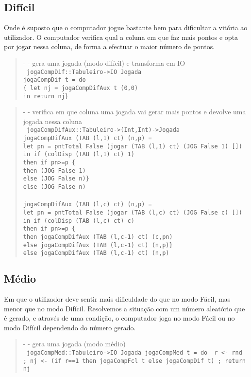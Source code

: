 \documentclass[a4paper,titlepage]{scrreprt}
\begin{document}
		\subsection{Difícil}
		Onde é suposto que o computador jogue bastante bem para dificultar a vitória ao utilizador. O computador
		verifica qual a coluna em que faz mais pontos e opta por jogar nessa coluna, de forma a efectuar o maior número de pontos.
			\begin{quote}
				{\small - - gera uma jogada (modo difícil) e transforma em IO\\}
				{\tt
				jogaCompDif::Tabuleiro->IO Jogada\\
				jogaCompDif t = do\\
				\{ let nj = jogaCompDifAux t (0,0)\\
				in return nj\}
				}
			\end{quote}
			\begin{quote}
				{\small - - verifica em que coluna uma jogada vai gerar mais pontos e devolve uma jogada nessa coluna\\}
				{\tt
				jogaCompDifAux::Tabuleiro->(Int,Int)->Jogada\\
				jogaCompDifAux (TAB (l,1) ct) (n,p) =\\
				let pn = pntTotal False (jogar (TAB (l,1) ct) (JOG False 1) [])\\
				in if (colDisp (TAB (l,1) ct) 1)\\
				then if pn>=p \{\\
				then (JOG False 1)\\
				else (JOG False n)\}\\
				else (JOG False n)\\\\
				jogaCompDifAux (TAB (l,c) ct) (n,p) =\\
				let pn = pntTotal False (jogar (TAB (l,c) ct) (JOG False c) [])\\
				in if (colDisp (TAB (l,c) ct) c)\\
				then if pn>=p \{\\
				then jogaCompDifAux (TAB (l,c-1) ct) (c,pn)\\
				else jogaCompDifAux (TAB (l,c-1) ct) (n,p)\}\\
				else jogaCompDifAux (TAB (l,c-1) ct) (n,p)
				}
			\end{quote}
		\subsection{Médio}
		Em que o utilizador deve sentir mais dificuldade do que no modo Fácil, mas menor que no modo Difícil. Resolvemos a
		situação com um número aleatório que é gerado, e através de uma condição, o computador joga no modo Fácil ou no modo Difícil
		dependendo do número gerado.
			\begin{quote}
				{\small - - gera uma jogada (modo médio)\\}
				{\tt
				jogaCompMed::Tabuleiro->IO Jogada
				jogaCompMed t = do
				{ r <- rnd
				; nj <- (if r==1 then jogaCompFcl t else jogaCompDif t)
				; return nj
				}
				}
			\end{quote}
\end{document}
